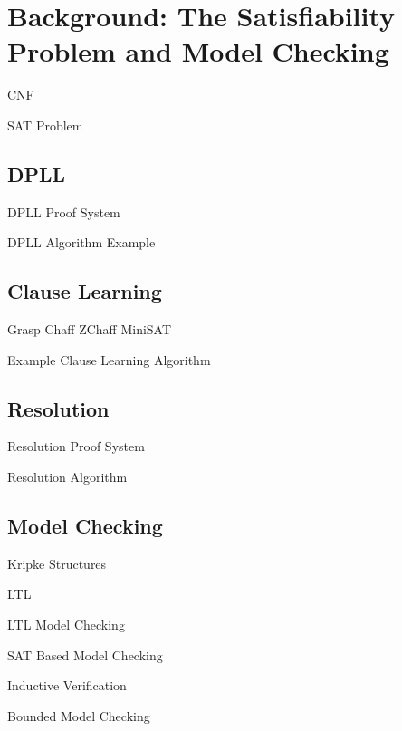 \chapter{Background: The Satisfiability Problem and Model Checking}

CNF

SAT Problem

\section{DPLL}
DPLL Proof System

DPLL Algorithm Example

\section{Clause Learning}
Grasp
Chaff ZChaff
MiniSAT

Example Clause Learning Algorithm

\section{Resolution}

Resolution Proof System

Resolution Algorithm

\section{Model Checking}

Kripke Structures

LTL 

LTL Model Checking

SAT Based Model Checking

Inductive Verification

Bounded Model Checking